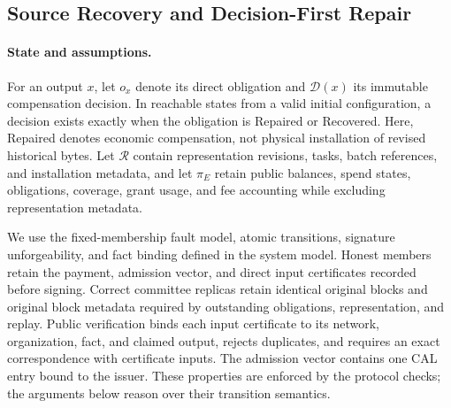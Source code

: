 
\subsection{Source Recovery and Decision-First Repair}
\label{sec:c3-security-draft}

\paragraph{State and assumptions.}
For an output $x$, let $o_x$ denote its direct obligation and
$\mathcal D(x)$ its immutable compensation decision. In reachable states
from a valid initial configuration, a decision exists exactly when the
obligation is \textsf{Repaired} or \textsf{Recovered}. Here,
\textsf{Repaired} denotes economic compensation, not physical installation
of revised historical bytes. Let $\mathcal R$ contain representation
revisions, tasks, batch references, and installation metadata, and let
$\pi_E$ retain public balances, spend states, obligations, coverage, grant
usage, and fee accounting while excluding representation metadata.

We use the fixed-membership fault model, atomic transitions, signature
unforgeability, and fact binding defined in the system model. Honest members
retain the payment, admission vector, and direct input certificates recorded
before signing. Correct committee replicas retain identical original blocks
and original block metadata required by outstanding obligations,
representation, and replay. Public verification binds each input certificate
to its network, organization, fact, and claimed output, rejects duplicates,
and requires an exact correspondence with certificate inputs. The admission
vector contains one CAL entry bound to the issuer. These properties are
enforced by the protocol checks; the arguments below reason over their
transition semantics.

